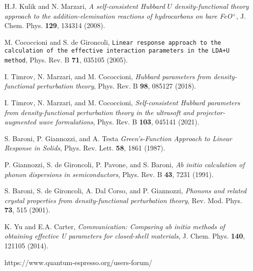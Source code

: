 \documentclass[12pt,a4paper]{article}
\begin{document}
\begin{thebibliography}{100}
   H.J. Kulik and N. Marzari, \textit{A self-consistent Hubbard $U$ density-functional theory approach to the addition-elemination reactions of hydrocarbons on bare FeO$^+$}, J. Chem. Phys. {\bf 129}, 134314 (2008).
  
   M. Cococcioni and S. de Gironcoli, \texttt{Linear response approach to the calculation of the effective interaction parameters in the LDA+U method}, Phys. Rev. B {\bf 71}, 035105 (2005).
  
   I. Timrov, N. Marzari, and M. Cococcioni, \textit{Hubbard parameters from density-functional perturbation theory}, Phys. Rev. B {\bf 98}, 085127 (2018).
  
   I. Timrov, N. Marzari, and M. Cococcioni, \textit{Self-consistent Hubbard parameters from density-functional perturbation theory in the ultrasoft and projector-augmented wave formulations}, Phys. Rev. B {\bf 103}, 045141 (2021).
  
   S. Baroni, P. Giannozzi, and A. Testa \textit{Green's-Function Approach to Linear Response in Solids}, Phys. Rev. Lett. {\bf 58}, 1861 (1987).
  
   P. Giannozzi, S. de Gironcoli, P. Pavone, and S. Baroni, \textit{Ab initio calculation of phonon dispersions in semiconductors}, Phys. Rev. B {\bf 43}, 7231 (1991).
  
   S. Baroni, S. de Gironcoli, A. Dal Corso, and P. Giannozzi, \textit{Phonons and related crystal properties from density-functional perturbation theory}, Rev. Mod. Phys. {\bf 73}, 515 (2001).
  
   K. Yu and E.A. Carter, \textit{Communication: Comparing ab initio methods of obtaining effective U parameters for closed-shell materials}, J. Chem. Phys. {\bf 140}, 121105 (2014).
  
   https://www.quantum-espresso.org/users-forum/
  
\end{thebibliography}
\end{document}
